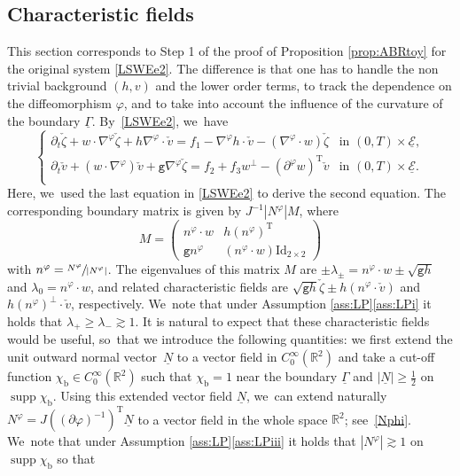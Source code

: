 \documentclass[JEP,XML,SOM,Unicode,NoFloatCountersInSection,published]{cedram}
\newcommand{\gr}{{\mathtt g}}
\newcommand{\R}{{\mathbb R}}
\newcommand{\dt}{\partial_t}
\newcommand{\cE}{{\mathcal E}}
\newcommand{\ul}[1]{\underline{#1}}
\newcommand{\itGamma}{\mathit{\Gamma}}
\theoremstyle{definition}
\begin{document}
\subsection{Characteristic fields}
This section corresponds to Step 1 of the proof of Proposition \ref{prop:ABRtoy} for the original system \eqref{LSWEe2}.
The difference is that one has to handle the non trivial background $(h,v)$ and the lower order terms, to track the dependence on the diffeomorphism $\varphi$,
and to take into account the influence of the curvature of the boundary $\ul{\itGamma}$. By~\eqref{LSWEe2}, we~have
\begin{equation}\label{LSWEe5}
\begin{cases}
\dt\check{\zeta}+w\cdot\nabla^\varphi\check{\zeta}+h\nabla^\varphi\cdot\check{v} = f_1-\nabla^\varphi h\cdot\check{v}-(\nabla^\varphi\cdot w)\check{\zeta}
&\text{in } (0,T)\times\ul{\cE}, \\
\dt\check{v}+(w\cdot\nabla^\varphi)\check{v}+\gr\nabla^\varphi\check{\zeta} = f_2 + f_3w^\perp-(\partial^\varphi w)^\mathrm{T}\check{v}
&\text{in } (0,T)\times\ul{\cE}. \\
\end{cases}
\end{equation}
Here, we~used the last equation in \eqref{LSWEe2} to derive the second equation.
The corresponding boundary matrix is given by $J^{-1}|N^\varphi| M$, where
\[
M =
\begin{pmatrix}
n^\varphi\cdot w & h(n^\varphi)^\mathrm{T} \\
\gr n^\varphi & (n^\varphi\cdot w)\mathrm{Id}_{2\times2}
\end{pmatrix}
\]
with $n^\varphi = \sfrac{N^\varphi}{|N^\varphi|}$.
The eigenvalues of this matrix $M$ are $\pm\lambda_{\pm}=n^\varphi\cdot w \pm \sqrt{\gr h}$ and $\lambda_0=n^\varphi\cdot w$, and related characteristic fields are
$\sqrt{\gr h}\check{\zeta}\pm h(n^\varphi\cdot\check{v})$ and $h(n^\varphi)^\perp\cdot\check{v}$, respectively. We~note that under Assumption \ref{ass:LP}\eqref{ass:LPi} it holds that $\lambda_+\geq\lambda_-\gtrsim1$.
It is natural to expect that these characteristic fields would be useful, so~that we introduce the following quantities:
we first extend the unit outward normal vector~$\ul{N}$ to a vector field in $C_0^\infty(\R^2)$ and take a cut-off function $\chi_\mathrm{b}\in C_0^\infty(\R^2)$
such that $\chi_\mathrm{b}=1$ near the boundary $\ul{\itGamma}$ and $|\ul{N}|\geq\frac12$ on $\operatorname{supp}\chi_\mathrm{b}$.
Using this extended vector field $\ul{N}$, we~can extend naturally $N^\varphi=J((\partial\varphi)^{-1})^\mathrm{T}\ul{N}$ to a vector field in the whole space $\R^2$; see~\eqref{Nphi}. We~note that under Assumption \ref{ass:LP}\eqref{ass:LPiii} it holds that $|N^\varphi| \gtrsim 1$ on $\operatorname{supp}\chi_\mathrm{b}$ so that
\end{document}
